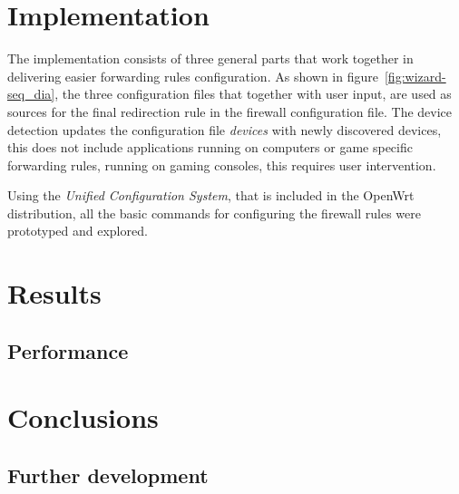\documentclass[a4paper,11pt]{kth-mag}
\begin{document}
\chapter{Implementation}
The implementation consists of three general parts that work together in delivering easier forwarding rules configuration.
As shown in figure~\ref{fig:wizard-seq_dia}, the three configuration files that together with user input, are used as sources for the final redirection rule in the firewall configuration file.
The device detection updates the configuration file \emph{devices} with newly discovered devices, this does not include applications running on computers or game specific forwarding rules, running on gaming consoles, this requires user intervention.


Using the \emph{Unified Configuration System}, that is included in the OpenWrt distribution, all the basic commands for configuring the firewall rules were prototyped and explored.

\chapter{Results}
\section{Performance}

\chapter{Conclusions}



\section{Further development}
\appendix
\addappheadtotoc

%



\end{document}
